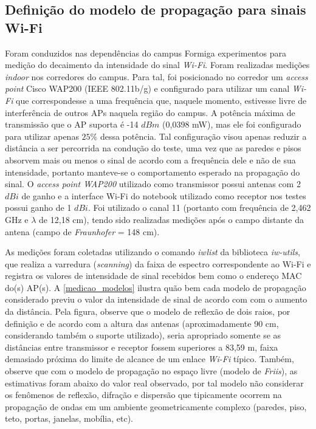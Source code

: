 \documentclass[
	12pt,				%
	twoside,			%
	a4paper,			%
	english,			%
	french,				%
	spanish,			%
	brazil				%
	]{abntex2}
\begin{document}
\subsection{Definição do modelo de propagação para sinais
Wi-Fi}\label{definiuxe7uxe3o-do-modelo-de-propagauxe7uxe3o-para-sinais-wi-fi}

Foram conduzidos nas dependências do campus Formiga experimentos para
medição do decaimento da intensidade do sinal \emph{Wi-Fi}. Foram
realizadas medições \emph{indoor} nos corredores do campus. Para tal,
foi posicionado no corredor um \emph{access point} Cisco WAP200 (IEEE
802.11b/g) e configurado para utilizar um canal \emph{Wi-Fi} que
correspondesse a uma frequência que, naquele momento, estivesse livre de
interferência de outros APs naquela região do campus. A potência máxima
de transmissão que o AP suporta é -14 \(dBm\) (0,0398 mW), mas ele foi
configurado para utilizar apenas \(25\%\) dessa potência. Tal
configuração visou apenas reduzir a distância a ser percorrida na
condução do teste, uma vez que as paredes e pisos absorvem mais ou menos
o sinal de acordo com a frequência dele e não de sua intensidade,
portanto manteve-se o comportamento esperado na propagação do sinal. O
\emph{access point WAP200} utilizado como transmissor possui antenas com
2 \(dBi\) de ganho e a interface Wi-Fi do notebook utilizado como
receptor nos testes possui ganho de 1 \(dBi\). Foi utilizado o canal 11
(portanto com frequência de 2,462 GHz e \(\lambda\) de 12,18 cm), tendo
sido realizadas medições após o campo distante da antena (campo de
\emph{Fraunhofer} = 148 cm).

As medições foram coletadas utilizando o comando \emph{iwlist} da
biblioteca \emph{iw-utils}, que realiza a varredura (\emph{scanning}) da
faixa de espectro correspondente ao Wi-Fi e registra os valores de
intensidade de sinal recebidos bem como o endereço MAC do(s) AP(s). A
\autoref{medicao_modelos} ilustra quão bem cada modelo de propagação
considerado previu o valor da intensidade de sinal de acordo com com o
aumento da distância. Pela figura, observe que o modelo de reflexão de
dois raios, por definição e de acordo com a altura das antenas
(aproximadamente 90 cm, considerando também o suporte utilizado), seria
apropriado somente se as distâncias entre transmissor e receptor fossem
superiores a 83,59 m, faixa demasiado próxima do limite de alcance de um
enlace \emph{Wi-Fi} típico. Também, observe que com o modelo de
propagação no espaço livre (modelo de \emph{Friis}), as estimativas
foram abaixo do valor real observado, por tal modelo não considerar os
fenômenos de reflexão, difração e dispersão que tipicamente ocorrem na
propagação de ondas em um ambiente geometricamente complexo (paredes,
piso, teto, portas, janelas, mobília, etc).
\end{document}
